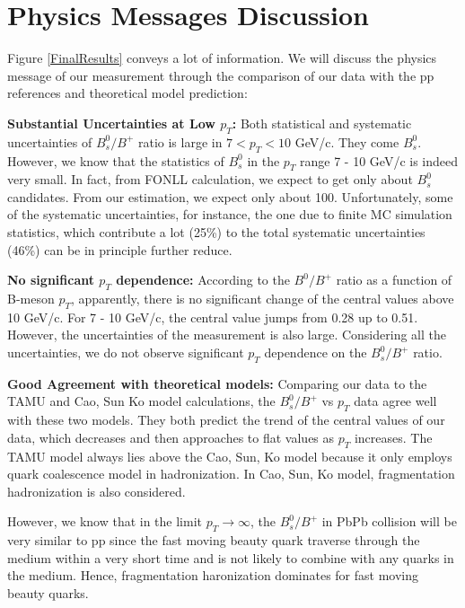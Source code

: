 \section{Physics Messages Discussion}

Figure \ref{FinalResults} conveys a lot of information. We will discuss the physics message of our measurement through the comparison of our data with the pp references and theoretical model prediction:



\textbf{Substantial Uncertainties at Low $p_T$:} Both statistical and systematic uncertainties of $B^0_s/B^+$ ratio is large in $7 < p_T < 10$ GeV/c. They come $B^0_s$. However, we know that the statistics of $B^0_s$ in the $p_T$ range 7 - 10 GeV/c is indeed very small. In fact, from FONLL calculation, we expect to get only about $B^0_s$ candidates. From our estimation, we expect only about 100. Unfortunately, some of the systematic uncertainties, for instance, the one due to finite MC simulation statistics, which contribute a lot (25\%) to the total systematic uncertainties (46\%) can be in principle further reduce. 

\textbf{No significant $p_T$ dependence:} According to the $B^0/B^+$ ratio as a function of B-meson $p_T$, apparently, there is no significant change of the central values above 10 GeV/c. For 7 - 10 GeV/c, the central value jumps from 0.28 up to 0.51. However, the uncertainties of the measurement is also large. Considering all the uncertainties, we do not observe significant $p_T$ dependence on the $B^0_s/B^+$ ratio.

\textbf{Good Agreement with theoretical models:} Comparing our data to the TAMU and Cao, Sun Ko model calculations, the $B^0_s/B^+$ vs $p_T$ data agree well with these two models. They both predict the trend of the central values of our data, which decreases and then approaches to flat values as $p_T$ increases. The TAMU model always lies above the Cao, Sun, Ko model because it only employs quark coalescence model in hadronization. In Cao, Sun, Ko model, fragmentation hadronization is also considered. 

However, we know that in the limit $p_T \rightarrow \infty$, the $B^0_s/B^+$ in PbPb collision will be very similar to pp since the fast moving beauty quark traverse through the medium within a very short time and is not likely to combine with any quarks in the medium. Hence, fragmentation haronization dominates for fast moving beauty quarks. 

